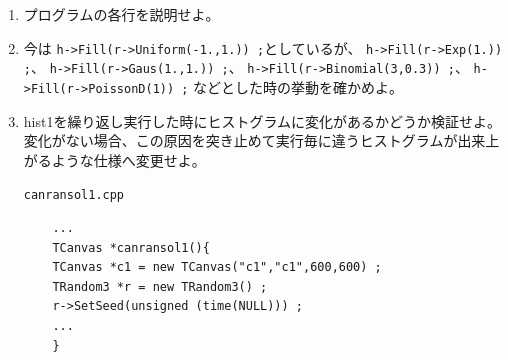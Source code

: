 \documentclass{jarticle}
\begin{document}
  \begin{enumerate}

   \item プログラムの各行を説明せよ。

   \item 今は
	 \verb|h->Fill(r->Uniform(-1.,1.)) ;|としているが、
	 \verb|h->Fill(r->Exp(1.)) ;|、
	 \verb|h->Fill(r->Gaus(1.,1.)) ;|、
	 \verb|h->Fill(r->Binomial(3,0.3)) ;|、
	 \verb|h->Fill(r->PoissonD(1)) ;|
	 などとした時の挙動を確かめよ。

   \item hist1を繰り返し実行した時にヒストグラムに変化があるかどうか検証せよ。
	 変化がない場合、この原因を突き止めて実行毎に違うヒストグラムが出来上がるような仕様へ変更せよ。
	 \begin{itembox}{\texttt{canransol1.cpp}}
\begin{verbatim}
	...
	TCanvas *canransol1(){
	TCanvas *c1 = new TCanvas("c1","c1",600,600) ;
	TRandom3 *r = new TRandom3() ;
	r->SetSeed(unsigned (time(NULL))) ;
	...
	}
\end{verbatim}
	 \end{itembox}

  \end{enumerate}


  \clearpage
\end{document}
